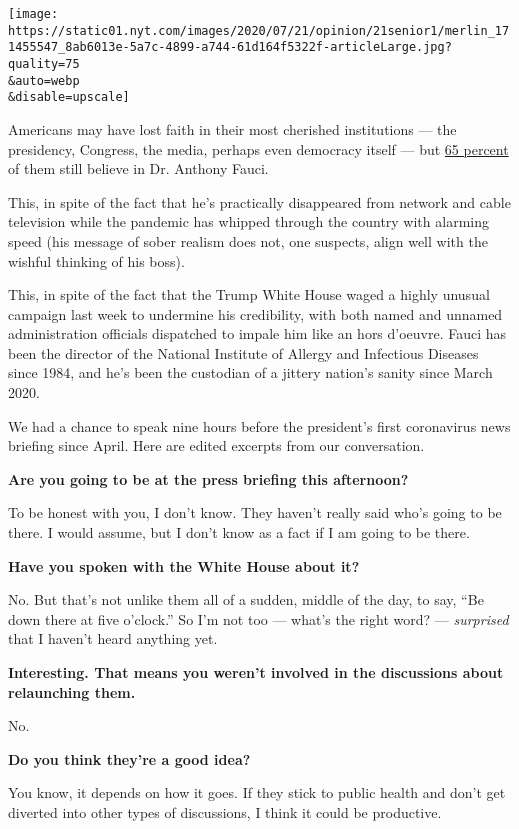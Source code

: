 \texttt{[image: https://static01.nyt.com/images/2020/07/21/opinion/21senior1/merlin\_171455547\_8ab6013e-5a7c-4899-a744-61d164f5322f-articleLarge.jpg?quality=75\\\&auto=webp\\\&disable=upscale]}

Americans may have lost faith in their most cherished institutions ---
the presidency, Congress, the media, perhaps even democracy itself ---
but
\href{https://www.nytimes.com/2020/07/17/us/politics/fauci-trump-coronavirus.html}{65
percent} of them still believe in Dr. Anthony Fauci.

This, in spite of the fact that he's practically disappeared from
network and cable television while the pandemic has whipped through the
country with alarming speed (his message of sober realism does not, one
suspects, align well with the wishful thinking of his boss).

This, in spite of the fact that the Trump White House waged a highly
unusual campaign last week to undermine his credibility, with both named
and unnamed administration officials dispatched to impale him like an
hors d'oeuvre. Fauci has been the director of the National Institute of
Allergy and Infectious Diseases since 1984, and he's been the custodian
of a jittery nation's sanity since March 2020.

We had a chance to speak nine hours before the president's first
coronavirus news briefing since April. Here are edited excerpts from our
conversation.

\textbf{Are you going to be at the press briefing this afternoon?}

To be honest with you, I don't know. They haven't really said who's
going to be there. I would assume, but I don't know as a fact if I am
going to be there.

\textbf{Have you spoken with the White House about it?}

No. But that's not unlike them all of a sudden, middle of the day, to
say, ``Be down there at five o'clock.'' So I'm not too --- what's the
right word? --- \emph{surprised} that I haven't heard anything yet.

\textbf{Interesting. That means you weren't involved in the discussions
about relaunching them.}

No.

\textbf{Do you think they're a good idea?}

You know, it depends on how it goes. If they stick to public health and
don't get diverted into other types of discussions, I think it could be
productive.

